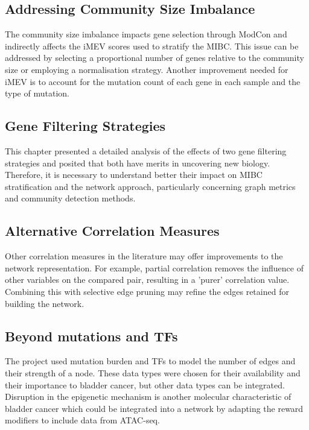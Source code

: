 \subsection*{Addressing Community Size Imbalance}

The community size imbalance impacts gene selection through ModCon and indirectly affects the iMEV scores used to stratify the MIBC. This issue can be addressed by selecting a proportional number of genes relative to the community size or employing a normalisation strategy. Another improvement needed for iMEV is to account for the mutation count of each gene in each sample and the type of mutation.

\subsection*{Gene Filtering Strategies}

This chapter presented a detailed analysis of the effects of two gene filtering strategies and posited that both have merits in uncovering new biology. Therefore, it is necessary to understand better their impact on MIBC stratification and the network approach, particularly concerning graph metrics and community detection methods.

\subsection*{Alternative Correlation Measures}

Other correlation measures in the literature may offer improvements to the network representation. For example, partial correlation removes the influence of other variables on the compared pair, resulting in a 'purer' correlation value. Combining this with selective edge pruning may refine the edges retained for building the network.

\subsection*{Beyond mutations and TFs}

The project used mutation burden and TFs to model the number of edges and their strength of a node. These data types were chosen for their availability and their importance to bladder cancer, but other data types can be integrated. Disruption in the epigenetic mechanism is another molecular characteristic of bladder cancer which could be integrated into a network by adapting the reward modifiers to include data from ATAC-seq.

